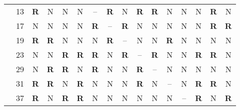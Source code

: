 \documentclass[17pt]{memoir}
\begin{document}
\begin{tabular}{@{}l@{\hskip 8mm}l|cccccccccccccc@{}}
                     & 13                       & \textbf{R} & N                         & N                         & N                         & --  & \textbf{R} & N                         & \textbf{R} & \textbf{R} & N                         & N                         & N                         & \textbf{R} & N                         \\
                     & 17                       & N                         & N                         & N                         & N                         & \textbf{R} & --  & \textbf{R} & N                         & N                         & N                         & N                         & N                         & \textbf{R} & \textbf{R} \\
                     & 19                       & \textbf{R} & \textbf{R} & N                         & N                         & N                         & \textbf{R} & --  & N                         & N                         & \textbf{R} & N                         & N                         & N                         & N                         \\
                     & 23                       & N                         & N                         & \textbf{R} & \textbf{R} & \textbf{R} & N                         & \textbf{R} & --  & \textbf{R} & N                         & N                         & \textbf{R} & \textbf{R} & N                         \\
                     & 29                       & N                         & \textbf{R} & \textbf{R} & N                         & \textbf{R} & N                         & N                         & \textbf{R} & --  & N                         & N                         & N                         & N                         & N                         \\
                     & 31                       & \textbf{R} & \textbf{R} & N                         & \textbf{R} & N                         & N                         & N                         & \textbf{R} & N                         & --  & N                         & \textbf{R} & \textbf{R} & N                         \\
                     & 37                       & \textbf{R} & N                         & \textbf{R} & \textbf{R} & N                         & N                         & N                         & N                         & N                         & N                         & --  & \textbf{R} & N                         & \textbf{R} \\

\end{tabular}
\end{document}
